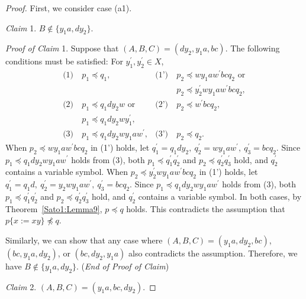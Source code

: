 \begin{proof}
  First, we consider case (a1).

  \smallskip

  \noindent
  \textit{Claim} 1. $B \not\in \{y_{1}a, dy_{2}\}$.

  \smallskip
  \noindent
  \textit{Proof of Claim} 1.
  Suppose that $(A, B, C) = (dy_{2}, y_{1}a, bc)$. The following conditions must be satisfied: For $y_{1}^{\prime},y_{2}^{\prime}\in X$, 
  \begin{align*}
    \textrm{(1)}~& p_{1} \preceq q_{1}, & \textrm{(1')}~& p_{2} \preceq wy_{1}aw^{\prime}bcq_{2}\mbox{ or} \\
    & & & p_{2} \preceq y_{2}^{\prime}wy_{1}aw^{\prime}bcq_{2},\\
    \textrm{(2)}~& p_{1} \preceq q_{1}dy_{2}w\mbox{ or}  & \textrm{(2')}~& p_{2} \preceq w^{\prime}bcq_{2},\\
    & p_{1} \preceq q_{1}dy_{2}wy_{1}^{\prime}, & & \\
    \textrm{(3)}~& p_{1} \preceq q_{1}dy_{2}wy_{1}aw^{\prime}, & \textrm{(3')}~& p_{2} \preceq q_{2}.
  \end{align*}
  When $p_{2} \preceq wy_{1}aw^{\prime}bcq_{2}$ in (1') holds, let $q^{\prime}_{1}=q_{1}dy_{2},~q^{\prime}_{2}=wy_{1}aw^{\prime},~q^{\prime}_{3}=bcq_{2}$.
  Since $p_{1} \preceq q_{1}dy_{2}wy_{1}aw^{\prime}$ holds from (3), both $p_{1} \preceq q^{\prime}_{1}q^{\prime}_{2}$ and $p_{2} \preceq q^{\prime}_{2}q^{\prime}_{3}$ hold, and $q_{2}^{\prime}$ contains a variable symbol.
  When $p_{2} \preceq y_{2}^{\prime}wy_{1}aw^{\prime}bcq_{2}$ in (1') holds, let $q^{\prime}_{1}=q_{1}d,~q^{\prime}_{2}=y_{2}wy_{1}aw^{\prime},~q^{\prime}_{3}=bcq_{2}$.
  Since $p_{1} \preceq q_{1}dy_{2}wy_{1}aw^{\prime}$ holds from (3), both $p_{1} \preceq q^{\prime}_{1}q^{\prime}_{2}$ and $p_{2} \preceq q^{\prime}_{2}q^{\prime}_{3}$ hold, and $q_{2}^{\prime}$ contains a variable symbol.
  In both cases, by Theorem~\ref{Sato1:Lemma9}, $p \preceq q$ holds.
  This contradicts the assumption that $p \{ x := xy \} \not \preceq q$.

  Similarly, we can show that any case where $(A, B, C) = (y_{1}a, dy_{2}, bc)$, $(bc, y_{1}a, dy_{2})$, or $(bc, dy_{2}, y_{1}a)$ also contradicts the assumption.
  Therefore, we have $B \not\in \{y_{1}a, dy_{2}\}$. (\textit{End of Proof of Claim})

  \smallskip

  \noindent
  \textit{Claim} 2. $(A, B, C) = (y_{1}a, bc, dy_{2})$.


\end{proof}
